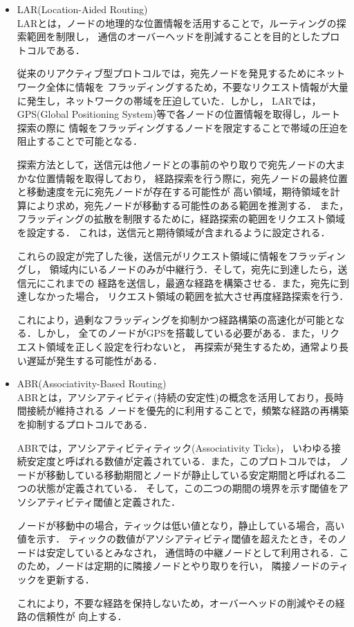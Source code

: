 \documentclass[a4paper, 11pt]{ltjsarticle}
\begin{document}
\begin{itemize}
  \item LAR(Location-Aided Routing)\cite{LAR} \\
  LARとは，ノードの地理的な位置情報を活用することで，ルーティングの探索範囲を制限し，
  通信のオーバーヘッドを削減することを目的としたプロトコルである．

  従来のリアクティブ型プロトコルでは，宛先ノードを発見するためにネットワーク全体に情報を
  フラッディングするため，不要なリクエスト情報が大量に発生し，ネットワークの帯域を圧迫していた．しかし，
  LARでは，GPS(Global Positioning System)等で各ノードの位置情報を取得し，ルート探索の際に
  情報をフラッディングするノードを限定することで帯域の圧迫を阻止することで可能となる．

  探索方法として，送信元は他ノードとの事前のやり取りで宛先ノードの大まかな位置情報を取得しており，
  経路探索を行う際に，宛先ノードの最終位置と移動速度を元に宛先ノードが存在する可能性が
  高い領域，期待領域を計算により求め，宛先ノードが移動する可能性のある範囲を推測する．
  また，フラッディングの拡散を制限するために，経路探索の範囲をリクエスト領域を設定する．
  これは，送信元と期待領域が含まれるように設定される．

  これらの設定が完了した後，送信元がリクエスト領域に情報をフラッディングし，
  領域内にいるノードのみが中継行う．そして，宛先に到達したら，送信元にこれまでの
  経路を送信し，最適な経路を構築させる．また，宛先に到達しなかった場合，
  リクエスト領域の範囲を拡大させ再度経路探索を行う．

  これにより，過剰なフラッディングを抑制かつ経路構築の高速化が可能となる．しかし，
  全てのノードがGPSを搭載している必要がある．また，リクエスト領域を正しく設定を行わないと，
  再探索が発生するため，通常より長い遅延が発生する可能性がある．\\

  \item ABR(Associativity-Based Routing)\cite{ABR} \\
  ABRとは，アソシアティビティ(持続の安定性)の概念を活用しており，長時間接続が維持される
  ノードを優先的に利用することで，頻繁な経路の再構築を抑制するプロトコルである．

  ABRでは，アソシアティビティティック(Associativity Ticks)，
  いわゆる接続安定度と呼ばれる数値が定義されている．また，このプロトコルでは，
  ノードが移動している移動期間とノードが静止している安定期間と呼ばれる二つの状態が定義されている．
  そして，この二つの期間の境界を示す閾値をアソシアティビティ閾値と定義された．
  
  ノードが移動中の場合，ティックは低い値となり，静止している場合，高い値を示す．
  ティックの数値がアソシアティビティ閾値を超えたとき，そのノードは安定しているとみなされ，
  通信時の中継ノードとして利用される．このため，ノードは定期的に隣接ノードとやり取りを行い，
  隣接ノードのティックを更新する．

  これにより，不要な経路を保持しないため，オーバーヘッドの削減やその経路の信頼性が
  向上する．

\end{itemize}
\end{document}
